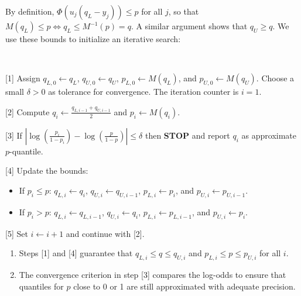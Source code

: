 %
By definition, $\Phi(u_j(q_L-y_j))\leq p$ for all $j$, so that $M(q_L)\leq p\iff q_L\leq M^{-1}(p)=q$.
A similar argument shows that $q_U\geq q$.
We use these bounds to initialize an iterative search:
%
\begin{samepage}
\begin{algorithm}~
\label{alg_quantile}
%
\begin{description}
\item{[1]} Assign $q_{L,0}\leftarrow q_L$, $q_{U,0}\leftarrow q_U$, $p_{L,0}\leftarrow M(q_L)$, and $p_{U,0}\leftarrow M(q_U)$.
Choose a small $\delta>0$ as tolerance for convergence.
The iteration counter is $i=1$.
%
\item{[2]} Compute $q_i\leftarrow\frac{q_{L,i-1}+q_{U,i-1}}{2}$ and $p_i\leftarrow M(q_i)$.
%
\item{[3]} If $\left|\log\left(\frac{p_i}{1-p_i}\right)-\log\left(\frac{p}{1-p}\right)\right|\leq\delta$ then \textbf{STOP} and report $q_i$ as approximate $p$-quantile.
%
\item{[4]} Update the bounds:
\begin{itemize}
\item If $p_i\leq p$: $q_{L,i}\leftarrow q_i$, $q_{U,i}\leftarrow q_{U,i-1}$, $p_{L,i}\leftarrow p_i$, and $p_{U,i}\leftarrow p_{U,i-1}$.
%
\item If $p_i>p$: $q_{L,i}\leftarrow q_{L,i-1}$, $q_{U,i}\leftarrow q_i$, $p_{L,i}\leftarrow p_{L,i-1}$, and $p_{U,i}\leftarrow p_i$.
\end{itemize}
%
\item{[5]} Set  $i\leftarrow i+1$ and continue with [2].
\end{description}
\end{algorithm}
\end{samepage}
%
\begin{remark}
\begin{enumerate}
\item Steps [1] and [4] guarantee that $q_{L,i}\leq q\leq q_{U,i}$ and $p_{L,i}\leq p\leq p_{U,i}$ for all $i$.
%
\item The convergence criterion in step [3] compares the log-odds to ensure that quantiles for $p$ close to 0 or 1 are still approximated with adequate precision.
\end{enumerate}
\end{remark}
\endinput
